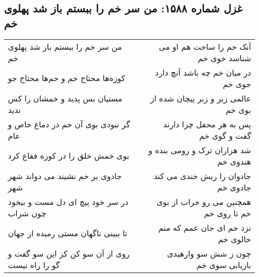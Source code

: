 \begin{center}
\section*{غزل شماره ۱۵۸۸: من سر خم را ببستم باز شد پهلوی خم}
\label{sec:1588}
\begin{longtable}{l p{0.5cm} r}
من سر خم را ببستم باز شد پهلوی خم
&&
آنک خم را ساخت هم او می شناسد خوی خم
\\
کوزه‌ها محتاج خم و خم‌ها محتاج جو
&&
در میان خم چه باشد آنچ دارد جوی خم
\\
مستیان بس پدید و خمشان را کس ندید
&&
عالمی زیر و زبر پیچان شده از بوی خم
\\
گر نبودی بوی آن خم در دماغ خاص و عام
&&
پس به هر محفل چرا دارند گفت و گوی خم
\\
بوی خمش خلق را در کوزه فقاع کرد
&&
شد هزاران ترک و رومی بنده و هندوی خم
\\
جادوی بر خم نشیند می دواند شهر شهر
&&
جادوان را ریش خندی می کند جادوی خم
\\
در سر خود پیچ ای دل مست و بیخود چون شراب
&&
همچنین می رو خراب از بوی خم تا روی خم
\\
تا ببینی ناگهان مستی رمیده از جهان
&&
نزد خم ای جان عمم که منم خالوی خم
\\
روی از آن سو کن کز این سو گفت و گو را راه نیست
&&
چون ز شش سو وارهیدی بازیابی سوی خم
\\
\end{longtable}
\end{center}
